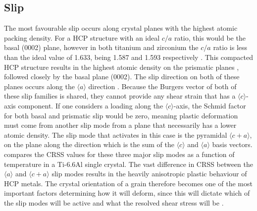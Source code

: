\subsection{Slip}
The most favourable slip occurs along crystal planes with the highest atomic packing density.
For a HCP structure with an ideal $c/a$ ratio, this would be the basal \hkl(0002) plane, however in both titanium and zirconium the $c/a$ ratio is less than the ideal value of 1.633, being 1.587 and 1.593 respectively \cite{leyensTitaniumTitaniumAlloys2003,committeeb10DeformationMechanismsTexture1988}.
This compacted HCP structure results in the highest atomic density on the prismatic planes , followed closely by the basal plane \hkl(0002).
The slip direction on both of these planes occurs along the $\langle a \rangle$ direction .
Because the Burgers vector of both of these slip families is shared, they cannot provide any shear strain that has a $\langle c \rangle$-axis component.
If one considers a loading along the $\langle c \rangle$-axis, the Schmid factor for both basal and prismatic slip would be zero, meaning plastic deformation must come from another slip mode from a plane that necessarily has a lower atomic density.
The slip mode that activates in this case is the pyramidal $\langle c + a \rangle$, on the  plane along the  direction which is the sum of the $\langle c \rangle$ and $\langle a \rangle$ basis vectors.
 compares the CRSS values for these three major slip modes as a function of temperature in a Ti-6.6Al single crystal. 
The vast difference in CRSS between the $\langle a \rangle$ and $\langle c + a \rangle$ slip modes results in the heavily anisotropic plastic behaviour of HCP metals.
The crystal orientation of a grain therefore becomes one of the most important factors determining how it will deform, since this will dictate which of the slip modes will be active and what the resolved shear stress will be \cite{battainiDeformationBehaviourTwinning2017,wangDirectMeasurementCritical2017,committeeb10DeformationMechanismsTexture1988}.



